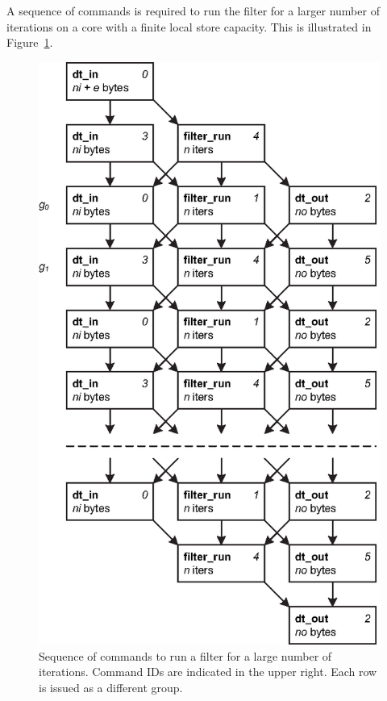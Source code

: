 A sequence of commands is required to run the filter for a larger
number of iterations on a core with a finite local store
capacity. This is illustrated in Figure~\ref{fig:lib:ext}.

\begin{figure}[!htb]
\begin{center}
\includegraphics[scale=.90]{figs/ext-efont}
\end{center}
\caption[Sequence of commands to run a filter for a large number of iterations.]{Sequence of commands to run a filter for a large number of iterations. Command IDs are indicated in the upper right. Each row is issued as a different group.}
\label{fig:lib:ext}
\end{figure}

